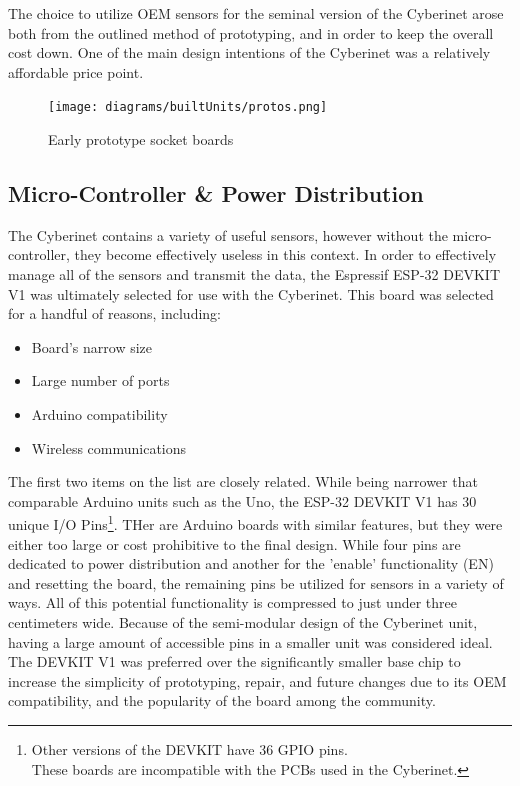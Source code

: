 The choice to utilize OEM sensors for the seminal version of the Cyberinet arose both from the outlined method of prototyping, and in order to keep the overall cost down. One of the main design intentions of the Cyberinet was a relatively affordable price point. 

\begin{figure}
    \centering
    \texttt{[image: diagrams/builtUnits/protos.png]}
    \caption{Early prototype socket boards}
    \label{fig:protoBoard}
\end{figure}



\subsection{Micro-Controller \& Power Distribution}

The Cyberinet contains a variety of useful sensors, however without the micro-controller, they become effectively useless in this context. In order to effectively manage all of the sensors and transmit the data, the Espressif ESP-32 DEVKIT V1 was ultimately selected for use with the Cyberinet. This board was selected for a handful of reasons, including:

\begin{itemize}
    \item Board's narrow size
    \item Large number of ports
    \item Arduino compatibility
    \item Wireless communications
\end{itemize}

The first two items on the list are closely related. While being narrower that comparable Arduino units such as the Uno, the ESP-32 DEVKIT V1 has 30 unique I/O Pins\footnote{Other versions of the DEVKIT have 36 GPIO pins. \\These boards are incompatible with the PCBs used in the Cyberinet.}. THer are Arduino boards with similar features, but they were either too large or cost prohibitive to the final design. While four pins are dedicated to power distribution and another for the 'enable' functionality (EN) and resetting the board, the remaining pins be utilized for sensors in a variety of ways. All of this potential functionality is compressed to just under three centimeters wide. Because of the semi-modular design of the Cyberinet unit, having a large amount of accessible pins in a smaller unit was considered ideal. The DEVKIT V1 was preferred over the significantly smaller base chip to increase the simplicity of prototyping, repair, and future changes due to its OEM compatibility, and the popularity of the board among the community.

